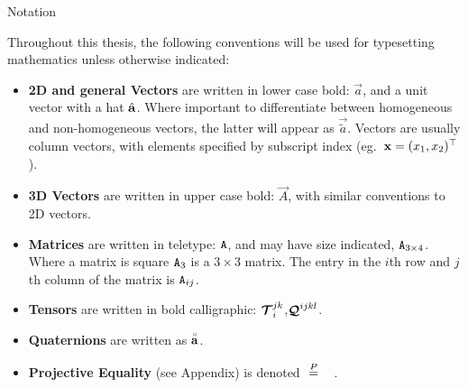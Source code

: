 \vspace*{20mm}
{
\Large\bf
\begin{center}
Notation
\end{center}
}

\label{sec:Notation}
Throughout this thesis, the following conventions will be used for
typesetting mathematics unless otherwise indicated:
\begin{itemize}
\item{\bf 2D and general Vectors} are written in lower case bold: $\vec{a}$,
and a unit vector with a hat $\mbox{$\hat{\boldsymbol{\rm a}}$}$. Where important to
differentiate between homogeneous and non-homogeneous vectors, the
latter will appear as
$\vec{\tilde{a}}$. Vectors are usually column vectors,
with elements specified by subscript index (eg.\
$\mbox{$\boldsymbol{\rm x}$}=(x_1,x_2)^\top$). 
\item{\bf 3D Vectors}  are written in upper case bold: $\vec{A}$, with similar conventions to 2D vectors.
\item{\bf Matrices} are written in teletype: $\mbox{$\boldsymbol{\tt A}$}$, and may have size indicated,
$\mbox{$\boldsymbol{\tt A}$}_{3\times4}$. Where a matrix is square $\mbox{$\boldsymbol{\tt A}$}_3$ is a $3\times 3$ matrix.
The entry in the $i$th row and $j$th column of the matrix is $\mbox{$\boldsymbol{\tt A}_{ij}$}$.
\item{\bf Tensors} are written in bold calligraphic:
$\mbox{$\boldsymbol{\cal T}^{jk}_{i}$}$,$\mbox{$\boldsymbol{\cal Q}^{ijkl}$}$.
\item{\bf Quaternions} are written as
$\mbox{$\stackrel{{\scriptscriptstyle \circ}}{\bf a}$}$.
\item{\bf Projective Equality} (see Appendix) is denoted $\mbox{$~\stackrel{P}{=}~$}$ ~.
\end{itemize}
